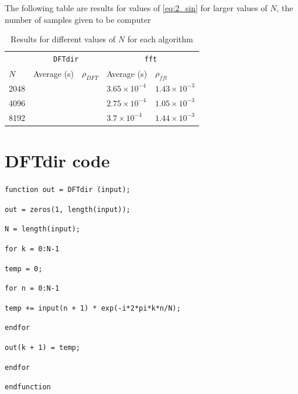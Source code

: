 \documentclass[a4paper, 12pt]{report}
\begin{document}
			The following table are results for values of \eqref{eq:2_sin} for larger values of $N$, the number of samples given to be computer
			\begin{table}[H]
				\begin{tabularx}{\textwidth}{X X X X X}
					\toprule
					& \multicolumn{2}{c}{\texttt{DFTdir}} & \multicolumn{2}{c}{\texttt{fft}} \\
					$N$ & Average (s) & $\rho_{DFT}$ & Average (s) & $\rho_{fft}$ \\
					\midrule
					2048 & & & $3.65 \times 10^{-4}$ & $1.43 \times 10^{-3}$ \\
					4096 & & & $2.75 \times 10^{-4}$ & $1.05 \times 10^{-3}$ \\
					8192 & & & $3.7 \times 10^{-4}$ & $1.44 \times 10^{-3}$ \\
					\bottomrule
				\end{tabularx}
				\caption{Results for different values of $N$ for each algorithm}
			\end{table}

	\appendix
	\chapter{DFTdir code} %
	\label{sec:dftdir_code}
		\texttt{function out = DFTdir (input);}\par
		\texttt{out = zeros(1, length(input));}\par
		\indent\texttt{N = length(input);}\par
		\texttt{for k = 0:N-1}\par
		\hspace*{2em}\texttt{temp = 0;}\par
		\hspace*{2em}\texttt{for n = 0:N-1}\par
		\hspace*{4em}\texttt{temp += input(n + 1) * exp(-i*2*pi*k*n/N);}\par
		\hspace*{2em}\texttt{endfor}\par
		\hspace*{2em}\texttt{out(k + 1) = temp;}\par
		\texttt{endfor}\par
		\noindent\texttt{endfunction}\par
\end{document}
